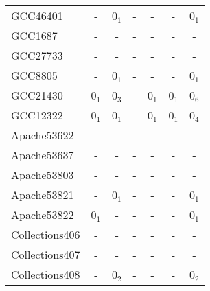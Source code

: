 \begin{table}
\begin{tabular}{lcccccc}
   \midrule
   GCC46401              &   -                  & 0$_1$                       & -                       & -                     &   -             & 0$_1$\\
   GCC1687               &   -                  & -                           & -                       & -                     &   -             & -\\
   GCC27733              &   -                  & -                           & -                       & -                     &   -             & - \\
   GCC8805               &   -                  & 0$_1$                       & -                       & -                     &   -             & 0$_1$\\
   GCC21430              &   0$_1$              & 0$_3$                       & -                       & 0$_1$                 &   0$_1$         & 0$_6$\\
   GCC12322              &   0$_1$              & 0$_1$                       & -                       & 0$_1$                 &   0$_1$         & 0$_4$\\
\midrule
\midrule
Apache53622		 &   -                  & -                           & -                       & -                     &   -             & -\\	  	
Apache53637		 &   -                  & -                           & -                       & -                     &   -             & -\\
Apache53803		 &   -                  & -                           & -                       & -                     &   -             & -\\
Apache53821	         &   -                  & 0$_1$                       & -                       & -                     &   -             &0$_1$\\
Apache53822	         &   0$_1$              & -                       & -                       & -                     &   -             &0$_1$\\
\midrule                 
Collections406           &   -                  & -                           & -                       & -                     &   -             & -\\  	
Collections407           &   -                  & -                           & -                       & -                     &   -             & -\\  	
Collections408           &   -                  & 0$_2$                       & -                       & -                     &   -             &0$_2$\\

\end{tabular}
\end{table}
